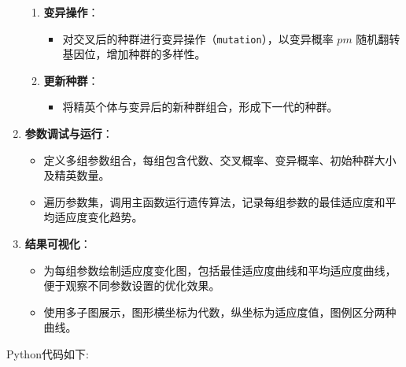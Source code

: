 \documentclass[journal,twoside,web]{ieeecolor}
\begin{document}
\begin{enumerate}
\begin{enumerate}
        \item \textbf{变异操作}：
        \begin{itemize}
            \item 对交叉后的种群进行变异操作（\texttt{mutation}），以变异概率 $pm$ 随机翻转基因位，增加种群的多样性。
        \end{itemize}

        \item \textbf{更新种群}：
        \begin{itemize}
            \item 将精英个体与变异后的新种群组合，形成下一代的种群。
        \end{itemize}
    \end{enumerate}

    \item \textbf{参数调试与运行}：
    \begin{itemize}
        \item 定义多组参数组合，每组包含代数、交叉概率、变异概率、初始种群大小及精英数量。
        \item 遍历参数集，调用主函数运行遗传算法，记录每组参数的最佳适应度和平均适应度变化趋势。
    \end{itemize}

    \item \textbf{结果可视化}：
    \begin{itemize}
        \item 为每组参数绘制适应度变化图，包括最佳适应度曲线和平均适应度曲线，便于观察不同参数设置的优化效果。
        \item 使用多子图展示，图形横坐标为代数，纵坐标为适应度值，图例区分两种曲线。
    \end{itemize}

\end{enumerate}
Python代码如下:
\end{document}

